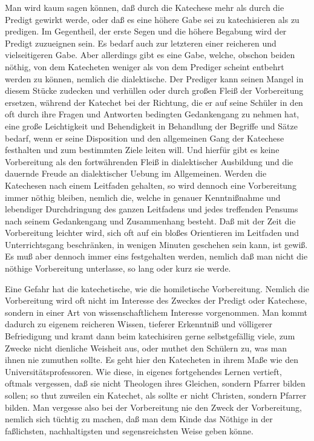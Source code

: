 Man wird kaum sagen können, daß durch die Katechese mehr als durch die Predigt gewirkt werde, oder daß es eine höhere Gabe sei zu katechisieren als zu predigen. Im Gegentheil, der erste Segen und die höhere Begabung wird der Predigt zuzueignen sein. Es bedarf auch zur letzteren einer reicheren und vielseitigeren Gabe. Aber allerdings gibt es eine Gabe, welche, obschon beiden nöthig, von dem Katecheten weniger als von dem Prediger scheint entbehrt werden zu können, nemlich die dialektische. Der Prediger kann seinen Mangel in diesem Stücke zudecken und verhüllen oder durch großen Fleiß der Vorbereitung ersetzen, während
der Katechet bei der Richtung, die er auf seine Schüler in den oft durch ihre Fragen und Antworten bedingten Gedankengang zu nehmen hat, eine große Leichtigkeit und Behendigkeit in Behandlung der Begriffe und Sätze bedarf, wenn er seine Disposition und den allgemeinen Gang der Katechese festhalten und zum bestimmten Ziele leiten will. Und hierfür gibt es keine Vorbereitung als den fortwährenden Fleiß in dialektischer Ausbildung und die dauernde Freude an dialektischer Uebung im Allgemeinen. Werden die Katechesen nach einem Leitfaden gehalten, so wird dennoch eine Vorbereitung immer nöthig bleiben, nemlich die, welche in genauer Kenntnißnahme und lebendiger Durchdringung des ganzen Leitfadens und jedes treffenden Pensums nach seinem Gedankengang und Zusammenhang besteht. Daß mit der Zeit die Vorbereitung leichter wird, sich oft auf ein bloßes Orientieren im Leitfaden und Unterrichtsgang beschränken, in wenigen Minuten geschehen sein kann, ist gewiß. Es muß aber dennoch immer eins festgehalten werden, nemlich daß man nicht die nöthige Vorbereitung unterlasse, so lang oder kurz sie werde.

Eine Gefahr hat die katechetische, wie die homiletische Vorbereitung. Nemlich die Vorbereitung wird oft nicht im Interesse des Zweckes der Predigt oder Katechese, sondern in einer Art von wissenschaftlichem Interesse vorgenommen. Man kommt dadurch zu eigenem reicheren Wissen, tieferer Erkenntniß und völligerer Befriedigung und kramt dann beim katechisiren gerne selbstgefällig viele, zum Zwecke nicht dienliche Weisheit aus, oder muthet den Schülern zu, was man ihnen
nie zumuthen sollte. Es geht hier den Katecheten in ihrem Maße wie den Universitätsprofessoren. Wie diese, in eigenes fortgehendes Lernen vertieft, oftmals vergessen, daß sie nicht Theologen ihres Gleichen, sondern Pfarrer bilden sollen; so thut zuweilen ein Katechet, als sollte er nicht Christen, sondern Pfarrer bilden. Man vergesse also bei der Vorbereitung nie den Zweck der Vorbereitung, nemlich sich tüchtig zu machen, daß man dem Kinde das Nöthige in der faßlichsten, nachhaltigsten und segensreichsten Weise geben könne.

